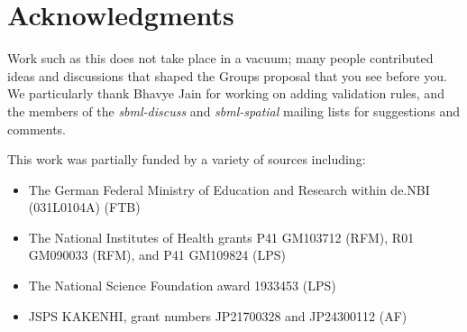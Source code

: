 
\section{Acknowledgments}

Work such as this does not take place in a vacuum; many people contributed ideas and discussions that shaped the Groups proposal that you see before you.  We particularly thank Bhavye Jain for working on adding validation rules, and the members of the \emph{sbml-discuss} and \emph{sbml-spatial} mailing lists for suggestions and comments.

This work was partially funded by a variety of sources including:
\begin{itemize}
  \item The German Federal Ministry of Education and Research within de.NBI (031L0104A) (FTB)
  \item The National Institutes of Health grants P41 GM103712 (RFM), R01 GM090033 (RFM), and P41 GM109824 (LPS)
  \item The National Science Foundation award 1933453 (LPS)
  \item JSPS KAKENHI, grant numbers JP21700328 and JP24300112 (AF)
\end{itemize}
